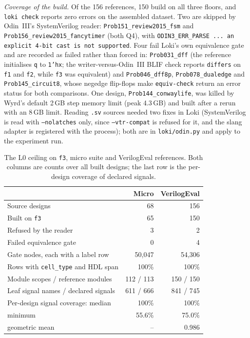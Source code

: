 \documentclass[conference]{IEEEtran}
\newcommand{\code}[1]{\texttt{#1}}
\begin{document}
\emph{Coverage of the build.} Of the 156 references, 150 build on all three floors, and
\code{loki check} reports zero errors on the assembled dataset. Two are skipped by Odin~III's
SystemVerilog reader: \code{Prob151\_review2015\_fsm} and \code{Prob156\_review2015\_fancytimer}
(both Q4), with \code{ODIN3\_ERR\_PARSE ... an explicit 4-bit cast is not supported}. Four
fail Loki's own equivalence gate and are recorded as failed rather than forced in:
\code{Prob031\_dff} (the reference initialises \code{q} to \code{1'hx}; the writer-versus-Odin~III
BLIF check reports \code{differs} on \code{f1} and \code{f2}, while \code{f3} was equivalent)
and \code{Prob046\_dff8p}, \code{Prob078\_dualedge} and \code{Prob145\_circuit8}, whose negedge
flip-flops make \code{equiv-check} return an error status for both comparisons. One design,
\code{Prob144\_conwaylife}, was killed by Wyrd's default 2\,GB step memory limit (peak 4.3\,GB)
and built after a rerun with an 8\,GB limit. Reading \code{.sv} sources needed two fixes in
Loki (SystemVerilog is read with \code{--nolatches} only, since \code{--vtr-compat} is refused
for it, and the slang adapter is registered with the process); both are in
\code{loki/odin.py} and apply to the experiment run.

\begin{table}[t]
\caption{The L0 ceiling on \code{f3}, micro suite and VerilogEval references. Both columns are
counts over all built designs; the last row is the per-design coverage of declared signals.}
\label{tab:l0-ceiling}
\centering
\footnotesize
\begin{tabular}{@{}lrr@{}}
\toprule
 & Micro & VerilogEval \\
\midrule
Source designs & 68 & 156 \\
Built on \code{f3} & 65 & 150 \\
Refused by the reader & 3 & 2 \\
Failed equivalence gate & 0 & 4 \\
Gate nodes, each with a label row & 50,047 & 54,306 \\
Rows with \code{cell\_type} and HDL span & 100\% & 100\% \\
Module scopes / reference modules & 112 / 113 & 150 / 150 \\
Leaf signal names / declared signals & 611 / 666 & 841 / 745 \\
Per-design signal coverage: median & 100\% & 100\% \\
\hspace{1em}minimum & 55.6\% & 75.0\% \\
\hspace{1em}geometric mean & -- & 0.986 \\
\bottomrule
\end{tabular}
\end{table}
\end{document}
